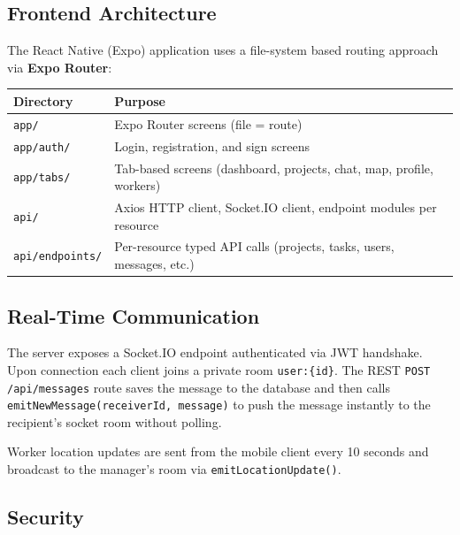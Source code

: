 \documentclass[12pt,a4paper]{article}
\begin{document}
\subsection{Frontend Architecture}

The React Native (Expo) application uses a file-system based routing approach via \textbf{Expo Router}:

\begin{tabular}{lp{}}
\toprule
\textbf{Directory} & \textbf{Purpose} \\
\midrule
\texttt{app/}             & Expo Router screens (file = route) \\
\texttt{app/auth/}        & Login, registration, and sign screens \\
\texttt{app/tabs/}        & Tab-based screens (dashboard, projects, chat, map, profile, workers) \\
\texttt{api/}             & Axios HTTP client, Socket.IO client, endpoint modules per resource \\
\texttt{api/endpoints/}   & Per-resource typed API calls (projects, tasks, users, messages, etc.) \\
\bottomrule
\end{tabular}

\subsection{Real-Time Communication}

The server exposes a Socket.IO endpoint authenticated via JWT handshake. Upon connection each client joins a private room \texttt{user:\{id\}}. The REST \texttt{POST /api/messages} route saves the message to the database and then calls \texttt{emitNewMessage(receiverId, message)} to push the message instantly to the recipient's socket room without polling.

Worker location updates are sent from the mobile client every 10 seconds and broadcast to the manager's room via \texttt{emitLocationUpdate()}.

\subsection{Security}
\end{document}
